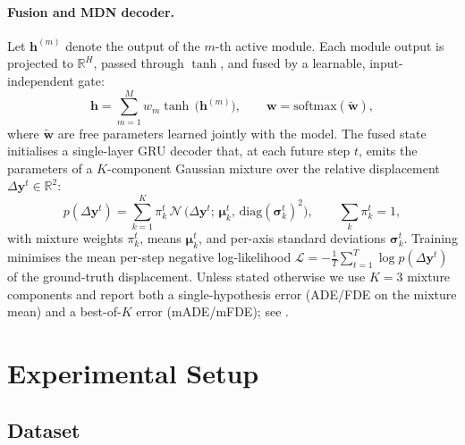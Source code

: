 \documentclass[runningheads]{preamp/llncs}
\begin{document}
\paragraph{Fusion and \ac{MDN} decoder.}
Let $\mathbf{h}^{(m)}$ denote the output of the $m$-th active module.
Each module output is projected to $\mathbb{R}^H$, passed through $\tanh$, and fused by
a learnable, input-independent gate:
%
\begin{equation}
\mathbf{h}=\sum_{m=1}^{M} w_m \tanh\,\big(\mathbf{h}^{(m)}\big),
\qquad
\mathbf{w}=\mathrm{softmax}(\tilde{\mathbf{w}}), \label{eq:fusion}
\end{equation}
%
where $\tilde{\mathbf{w}}$ are free parameters learned jointly with the model.
%
The fused state initialises a single-layer \ac{GRU} decoder that, at each future step $t$, emits the parameters of
a $K$-component Gaussian mixture over the relative displacement $\Delta\mathbf{y}^{t}\in\mathbb{R}^{2}$:
\begin{equation}
\label{eq:mdn}
	p\!\left(\Delta\mathbf{y}^{t}\right)=\sum_{k=1}^{K}\pi_k^{t}\,
	\mathcal{N}\,\big(\Delta\mathbf{y}^{t};\,\boldsymbol{\mu}_k^{t},\,\mathrm{diag}(\boldsymbol{\sigma}_k^{t})^{2}\big),
	\qquad \textstyle\sum_k \pi_k^{t}=1,
\end{equation}
%
with mixture weights $\pi_k^{t}$, means $\boldsymbol{\mu}_k^{t}$, and per-axis standard deviations
$\boldsymbol{\sigma}_k^{t}$. Training minimises the mean per-step negative log-likelihood
$\mathcal{L}=-\frac{1}{T}\sum_{t=1}^{T}\log p(\Delta\mathbf{y}^{t})$ of the ground-truth displacement.
Unless stated otherwise we use $K{=}3$ mixture components and report both a single-hypothesis error
(\acs{ADE}/\acs{FDE} on the mixture mean) and a best-of-$K$ error (\acs{mADE}/\acs{mFDE}); see
.


\section{Experimental Setup}
\label{sec:experiments}

\subsection{Dataset}
\end{document}
